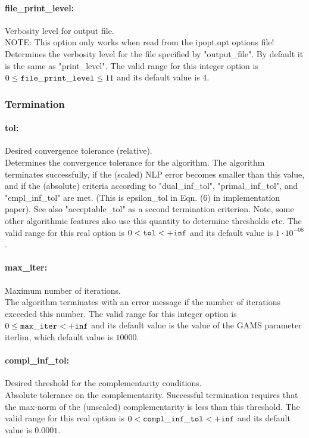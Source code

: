 \paragraph{file\_print\_level:} Verbosity level for output file. $\;$ \\
 NOTE: This option only works when read from the
ipopt.opt options file! Determines the verbosity
level for the file specified by "output\_file". 
By default it is the same as "print\_level". The valid range for this integer option is
$0 \le {\tt file\_print\_level } \le 11$
and its default value is $4$.

\subsubsection{Termination}

\paragraph{tol:} Desired convergence tolerance (relative). $\;$ \\
 Determines the convergence tolerance for the
algorithm.  The algorithm terminates
successfully, if the (scaled) NLP error becomes
smaller than this value, and if the (absolute)
criteria according to "dual\_inf\_tol",
"primal\_inf\_tol", and "cmpl\_inf\_tol" are met.
 (This is epsilon\_tol in Eqn. (6) in
implementation paper).  See also
"acceptable\_tol" as a second termination
criterion.  Note, some other algorithmic features
also use this quantity to determine thresholds
etc. The valid range for this real option is 
$0 <  {\tt tol } <  {\tt +inf}$
and its default value is $1 \cdot 10^{-08}$.


\paragraph{max\_iter:} Maximum number of iterations. $\;$ \\
 The algorithm terminates with an error message if
the number of iterations exceeded this number. The valid range for this integer option is
$0 \le {\tt max\_iter } <  {\tt +inf}$
and its default value is the value of the GAMS parameter iterlim, which default value is $10000$.


\paragraph{compl\_inf\_tol:} Desired threshold for the complementarity conditions. $\;$ \\
 Absolute tolerance on the complementarity.
Successful termination requires that the max-norm
of the (unscaled) complementarity is less than
this threshold. The valid range for this real option is 
$0 <  {\tt compl\_inf\_tol } <  {\tt +inf}$
and its default value is $0.0001$.


